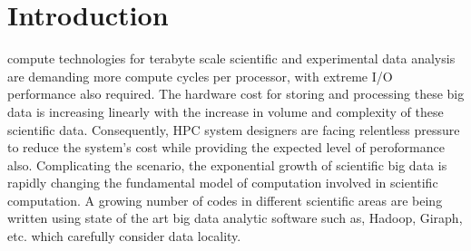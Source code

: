 \documentclass[journal]{IEEEtran}
\begin{document}
%
\IEEEpeerreviewmaketitle



\section{Introduction}
% 
% 
% 
% 

 

 compute technologies for terabyte scale scientific and experimental data analysis are demanding more compute cycles per processor, with extreme I/O performance also required. The hardware cost for storing and processing these big data is increasing linearly with the increase in volume and complexity of these scientific data. Consequently, HPC system designers are facing relentless pressure to reduce the system's cost while providing the expected level of peroformance also. Complicating the scenario, the exponential growth of scientific big data is rapidly changing the fundamental model of computation involved in scientific computation. A growing number of codes in different scientific areas are being written using state of the art big data analytic software such as, Hadoop, Giraph, etc. which carefully consider data locality.
\end{document}
